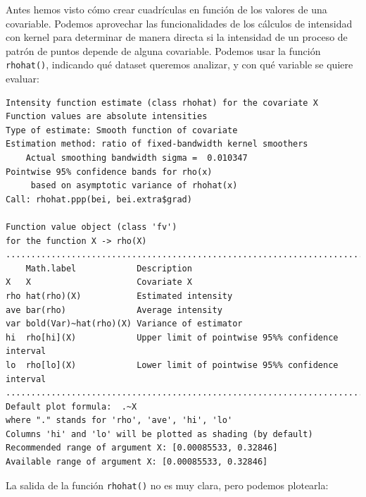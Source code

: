 \documentclass[
  letterpaper,
  DIV=11,
  numbers=noendperiod]{scrreprt}
\newenvironment{Shaded}{\begin{snugshade}}{\end{snugshade}}
\newcommand{\FunctionTok}[1]{\textcolor[rgb]{0.28,0.35,0.67}{#1}}
\newcommand{\NormalTok}[1]{\textcolor[rgb]{0.00,0.23,0.31}{#1}}
\newcommand{\SpecialCharTok}[1]{\textcolor[rgb]{0.37,0.37,0.37}{#1}}
\begin{document}
Antes hemos visto cómo crear cuadrículas en función de los valores de
una covariable. Podemos aprovechar las funcionalidades de los cálculos
de intensidad con kernel para determinar de manera directa si la
intensidad de un proceso de patrón de puntos depende de alguna
covariable. Podemos usar la función \texttt{rhohat()}, indicando qué
dataset queremos analizar, y con qué variable se quiere evaluar:

\begin{Shaded}
\end{Shaded}

\begin{verbatim}
Intensity function estimate (class rhohat) for the covariate X
Function values are absolute intensities
Type of estimate: Smooth function of covariate
Estimation method: ratio of fixed-bandwidth kernel smoothers
    Actual smoothing bandwidth sigma =  0.010347
Pointwise 95% confidence bands for rho(x)
     based on asymptotic variance of rhohat(x)
Call: rhohat.ppp(bei, bei.extra$grad)

Function value object (class 'fv')
for the function X -> rho(X)
...........................................................................
    Math.label            Description                                      
X   X                     Covariate X                                      
rho hat(rho)(X)           Estimated intensity                              
ave bar(rho)              Average intensity                                
var bold(Var)~hat(rho)(X) Variance of estimator                            
hi  rho[hi](X)            Upper limit of pointwise 95%% confidence interval
lo  rho[lo](X)            Lower limit of pointwise 95%% confidence interval
...........................................................................
Default plot formula:  .~X
where "." stands for 'rho', 'ave', 'hi', 'lo'
Columns 'hi' and 'lo' will be plotted as shading (by default)
Recommended range of argument X: [0.00085533, 0.32846]
Available range of argument X: [0.00085533, 0.32846]
\end{verbatim}

La salida de la función \texttt{rhohat()} no es muy clara, pero podemos
plotearla:

\begin{Shaded}
\end{Shaded}
\end{document}
